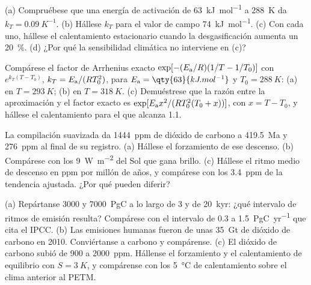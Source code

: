 \begin{exercise}[$\star\star$]\label{exo:b2:deep-time-climate:5}
(a) Compruébese que una energía de activación de \qty{63}{kJ.mol^{-1}} a \qty{288}{K} da $k_T =
\qty{0.09}{K^{-1}}$. (b) Hállese $k_T$ para el valor de campo \qty{74}{kJ.mol^{-1}}. (c) Con cada uno, hállese
el calentamiento estacionario cuando la desgasificación aumenta un \qty{20}{\percent}. (d) ¿Por qué la sensibilidad
climática no interviene en (c)?
\end{exercise}

\begin{exercise}[$\star\star$]\label{exo:b2:deep-time-climate:6}
Compárese el factor de Arrhenius exacto $\exp[-(E_{\text a}/R)(1/T - 1/T_0)]$ con $e^{k_T(T -
T_0)}$, $k_T = E_{\text a}/(RT_0^2)$, para $E_{\text a} = \qty{63}{kJ.mol^{-1}}$ y $T_0 =
\qty{288}{K}$: (a) en $T = \qty{293}{K}$; (b) en $T = \qty{318}{K}$. (c) Demuéstrese que la razón entre la
aproximación y el factor exacto es $\exp[E_{\text a}x^2/(RT_0^2(T_0 + x))]$, con $x = T - T_0$,
y hállese el calentamiento para el que alcanza 1.1.
\end{exercise}

\begin{exercise}[$\star\star$]\label{exo:b2:deep-time-climate:7}
La compilación suavizada da \qty{1444}{ppm} de dióxido de carbono a \qty{419.5}{Ma} y
\qty{276}{ppm} al final de su registro. (a) Hállese el forzamiento de ese descenso. (b) Compárese con
los \qty{9}{W.m^{-2}} del Sol que gana brillo. (c) Hállese el ritmo medio de descenso en ppm por millón de
años, y compárese con los \qty{3.4}{ppm} de la tendencia ajustada. ¿Por qué pueden diferir?
\end{exercise}

\begin{exercise}[$\star\star$]\label{exo:b2:deep-time-climate:8}
(a) Repártanse \num{3000} y \qty{7000}{PgC} a lo largo de 3 y de \qty{20}{kyr}: ¿qué intervalo de ritmos de
emisión resulta? Compárese con el intervalo de 0.3 a \qty{1.5}{PgC.yr^{-1}} que cita el IPCC. (b) Las emisiones humanas
fueron de unas \qty{35}{Gt} de dióxido de carbono en 2010. Conviértanse a carbono y compárense. (c) El dióxido de
carbono subió de 900 a \qty{2000}{ppm}. Hállense el forzamiento y el calentamiento de equilibrio con $S =
\qty{3}{K}$, y compárense con los \qty{5}{\celsius} de calentamiento sobre el clima anterior al PETM.
\end{exercise}

